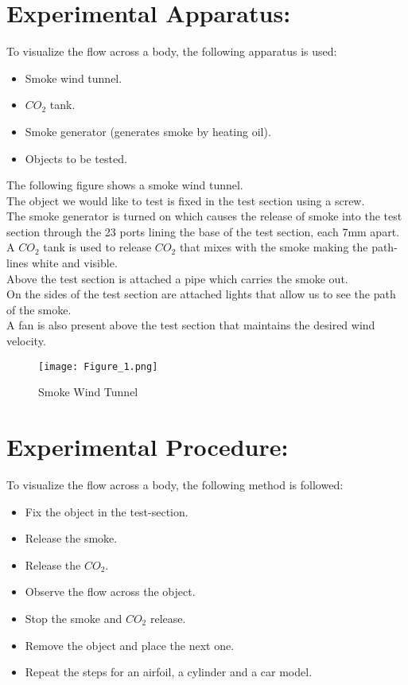 \documentclass[12pt,a4paper]{article}
\begin{document}
\section{Experimental Apparatus:}
To visualize the flow across a body, the following apparatus is used:
\begin{itemize}
\item Smoke wind tunnel.
\item $CO_2$ tank.
\item Smoke generator (generates smoke by heating oil).
\item Objects to be tested.
\end{itemize}
The following figure shows a smoke wind tunnel.\\
The object we would like to test is fixed in the test section using a screw.\\
The smoke generator is turned on which causes the release of smoke into the test section through the 23 ports lining the base of the test section, each 7mm apart.\\
A $CO_2$ tank is used to release $CO_2$ that mixes with the smoke making the path-lines white and visible.\\
Above the test section is attached a pipe which carries the smoke out.\\
On the sides of the test section are attached lights that allow us to see the path of the smoke.\\
A fan is also present above the test section that maintains the desired wind velocity.
\begin{figure}[!ht]
	\begin{center}
			\texttt{[image: Figure\_1.png]}
	\end{center}
	\caption{Smoke Wind Tunnel}
\end{figure}
\section{Experimental Procedure:}
To visualize the flow across a body, the following method is followed:
\begin{itemize}
\item Fix the object in the test-section.
\item Release the smoke.
\item Release the $CO_2$.
\item Observe the flow across the object.
\item Stop the smoke and $CO_2$ release.
\item Remove the object and place the next one.
\item Repeat the steps for an airfoil, a cylinder and a car model.
\end{itemize}
\end{document}
